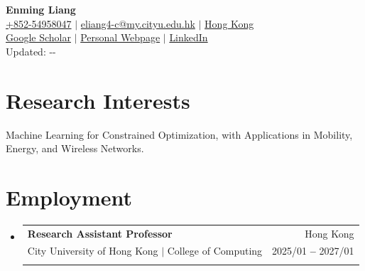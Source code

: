 \documentclass[letterpaper,11pt]{article}
\makeatletter
\newcommand{\resumeItem}[1]{
  \item\small{
    {#1 \vspace{-2pt}}
  }
}
\newcommand{\resumeEducationHeading}[6]{
  \vspace{-2pt}\item
    \begin{tabular*}{0.97\textwidth}[t]{l@{\extracolsep{\fill}}r}
      \textbf{#1} & \small #2 \\
      {\small#3} & {\small #4} \\
      {\small#5} & {\small #6} \\
    \end{tabular*}\vspace{-5pt}
}
\newcommand{\resumeSubHeadingListStart}{\begin{itemize}[leftmargin=0.15in, label={}]}
\newcommand{\resumeSubHeadingListEnd}{\end{itemize}}
\newcommand{\resumeItemListStart}{\begin{itemize}}
\newcommand{\resumeItemListEnd}{\end{itemize}\vspace{-5pt}}
\renewcommand{\today}{\number\year-\number\month-\number\day }
\makeatother
\begin{document}

\begin{center}
    \textbf{\Huge Enming Liang} \\ 
    \vspace{10pt}
    \faMobile \hspace{.5pt} \href{tel:85254958047}{+852-54958047}
    $|$
    \faAt \hspace{.5pt} \href{eliang4-c@my.cityu.edu.hk}{eliang4-c@my.cityu.edu.hk}
    $|$
    \faMapMarker \hspace{.5pt} \href{d}{Hong Kong} 
\\   \vspace{5pt}
    \faGoogle \hspace{.5pt} \href{https://scholar.google.com.sg/citations?user=Todfu6AAAAAJ&hl=zh-CN}{Google Scholar}
    $|$
    \faGithub \hspace{.5pt} \href{https://emliang.github.io/}{Personal Webpage}
    $|$
    \faLinkedinSquare \hspace{.5pt} \href{https://www.linkedin.com/in/enming-liang-95b5b216a/}{LinkedIn}
\\    \vspace{10pt}
     Updated: \today
\end{center}





\section{\LARGE Research Interests}
  \vspace{5pt}
    {Machine Learning for Constrained Optimization, with Applications in Mobility, Energy, and Wireless Networks.}{}



\section{\LARGE Employment}
\vspace{5pt}
\resumeSubHeadingListStart
  \resumeEducationHeading
    {Research Assistant Professor}{Hong Kong}
    {City University of Hong Kong $|$ College of Computing}{2025/01 \textbf{--} 2027/01}
    {}{}
  \resumeSubHeadingListEnd
\end{document}
